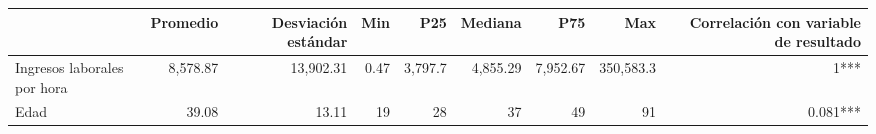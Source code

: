 \begin{table}[t]
\fontsize{12.0pt}{14.4pt}\selectfont
\begin{tabular*}{\linewidth}{@{\extracolsep{\fill}}lrrrrrrrr}
\toprule
  & Promedio & Desviación 
estándar & Min & P25 & Mediana & P75 & Max & Correlación con 
 variable de resultado \\ 
\midrule\addlinespace[2.5pt]
Ingresos laborales por hora & 8,578.87 & 13,902.31 & 0.47 & 3,797.7 & 4,855.29 & 7,952.67 & 350,583.3 & 1*** \\ 
Edad & 39.08 & 13.11 & 19 & 28 & 37 & 49 & 91 & 0.081*** \\ 
\bottomrule
\end{tabular*}
\end{table}

